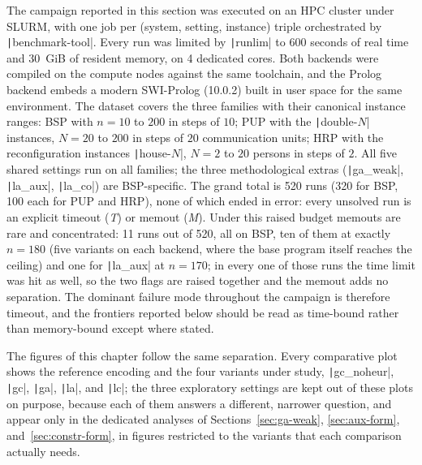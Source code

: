 The campaign reported in this section was executed on an HPC cluster under SLURM, with one job per (system, setting, instance) triple orchestrated by \texttt|benchmark-tool|. Every run was limited by \texttt|runlim| to 600 seconds of real time and 30~GiB of resident memory, on 4 dedicated cores. Both backends were compiled on the compute nodes against the same toolchain, and the Prolog backend embeds a modern SWI-Prolog (10.0.2) built in user space for the same environment. The dataset covers the three families with their canonical instance ranges: BSP with $n = 10$ to $200$ in steps of $10$; PUP with the \texttt|double-$N$| instances, $N = 20$ to $200$ in steps of $20$ communication units; HRP with the reconfiguration instances \texttt|house-$N$|, $N = 2$ to $20$ persons in steps of $2$. All five shared settings run on all families; the three methodological extras (\texttt|ga_weak|, \texttt|la_aux|, \texttt|la_co|) are BSP-specific. The grand total is 520 runs (320 for BSP, 100 each for PUP and HRP), none of which ended in error: every unsolved run is an explicit timeout (\emph{T}) or memout (\emph{M}). Under this raised budget memouts are rare and concentrated: 11 runs out of 520, all on BSP, ten of them at exactly $n=180$ (five variants on each backend, where the base program itself reaches the ceiling) and one for \texttt|la_aux| at $n=170$; in every one of those runs the time limit was hit as well, so the two flags are raised together and the memout adds no separation. The dominant failure mode throughout the campaign is therefore timeout, and the frontiers reported below should be read as time-bound rather than memory-bound except where stated.

The figures of this chapter follow the same separation. Every comparative plot shows the reference encoding and the four variants under study, \texttt|gc_noheur|, \texttt|gc|, \texttt|ga|, \texttt|la|, and \texttt|lc|; the three exploratory settings are kept out of these plots on purpose, because each of them answers a different, narrower question, and appear only in the dedicated analyses of Sections~\ref{sec:ga-weak}, \ref{sec:aux-form}, and~\ref{sec:constr-form}, in figures restricted to the variants that each comparison actually needs.

